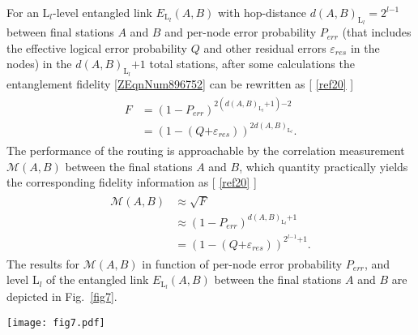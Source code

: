 \documentclass[11pt]{article}%
\newcommand{\fref}[1]{Fig.~\ref{#1}}
\newcommand*{\cref}[1]{%
  \begingroup
    \hypersetup{
      linkcolor=linkequation,
      linkbordercolor=linkequation,
    }%
    \ref{#1}%
  \endgroup
}
\begin{document}
 For an ${\mathrm{L}}_l$-level entangled link $E_{{\mathrm{L}}_l}\left(A,B\right)$ with hop-distance $d{\left(A,B\right)}_{{\mathrm{L}}_l}\mathrm{=}{\mathrm{2}}^{l\mathrm{-}\mathrm{1}}$ between final stations $A$ and $B$  and per-node error probability $P_{err}$ (that includes the effective logical error probability $Q$ and other residual errors ${\varepsilon }_{res}$ in the nodes) in the $d{\left(A,B\right)}_{{\mathrm{L}}_l}\mathrm{+1}$ total stations, after some calculations the entanglement fidelity \eqref{ZEqnNum896752} can be rewritten as [\cref{ref20}]
\begin{equation} \label{57)} 
 \begin{array}{l}
\begin{split}
F&\mathrm{=}{\left(\mathrm{1-}P_{err}\right)}^{\mathrm{2}\left(d{\left(A,B\right)}_{{\mathrm{L}}_l}\mathrm{+1}\right)\mathrm{-}\mathrm{2}} \\ 
&\mathrm{=}{\left(\mathrm{1-}\left(Q\mathrm{+}{\varepsilon }_{res}\right)\right)}^{\mathrm{2}d{\left(A,B\right)}_{{\mathrm{L}}_l}}. 
\end{split}
\end{array}
\end{equation} 
The performance of the routing is approachable by the correlation measurement $\mathcal{M}\left(A,B\right)$ between the final stations $A$ and $B$, which quantity practically yields the corresponding fidelity information as [\cref{ref20}]
\begin{equation} \label{58)} 
 \begin{array}{l}
\begin{split}
\mathcal{M}\left(A,B\right)&\mathrm{\approx }\sqrt{F} \\ 
&\mathrm{\approx }{\left(\mathrm{1-}P_{err}\right)}^{d{\left(A,B\right)}_{{\mathrm{L}}_l}\mathrm{+1}} \\ 
&\mathrm{=}{\left(\mathrm{1-}\left(Q\mathrm{+}{\varepsilon }_{res}\right)\right)}^{{\mathrm{2}}^{l\mathrm{-}\mathrm{1}}\mathrm{+1}}. 
\end{split}
\end{array}
\end{equation} 
The results for $\mathcal{M}\left(A,B\right)$ in function of per-node error probability $P_{err}$, and level ${\mathrm{L}}_l$ of  the entangled link $E_{{\mathrm{L}}_l}\left(A,B\right)$ between the final stations $A$ and $B$  are depicted in \fref{fig7}. 

\begin{figure*}[h!]
\vspace{-0.6cm}
 \begin{center}
 	 \texttt{[image: fig7.pdf]}

\caption{The $F$ entanglement fidelity as obtainable from the correlation measurement $\mathcal{M}\left(A,B\right)\mathrm{\approx }\sqrt{F}$ between final stations $A$ and $B$, at per-node error probability $P_{err}\mathrm{=}\left[\mathrm{0,0.025}\right]$, hop distance $d{\left(A,B\right)}_{{\mathrm{L}}_l}\mathrm{=}{\mathrm{2}}^{l\mathrm{-}\mathrm{1}}$, and entanglement level ${\mathrm{L}}_l\mathrm{=}\left[\mathrm{1,10}\right]$.}
\label{fig7}
\end{center}
\end{figure*}
\end{document}
